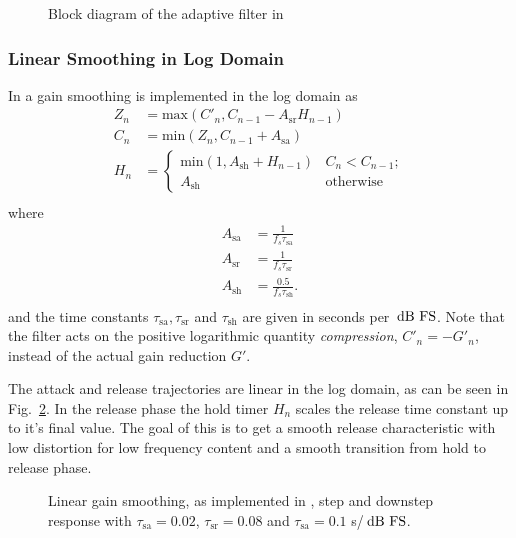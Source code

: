 \documentclass[../main2.tex]{subfiles}
\providecommand{\rootdir}{..}
\begin{document}
\begin{figure}
\centerline{}
\caption{Block diagram of the adaptive filter in \cite{mcnally1984dynamic}}
\label{fig:block_mcnally_theory_adap_filter}
\end{figure}
\subsubsection{Linear Smoothing in Log Domain}
In \cite{frindle1996implementation} a gain smoothing is implemented in the log domain as
\begin{equation}\label{eq:frindle_gainsmooth}
\begin{split}
Z_n &= \text{max}(C'_n, C_{n-1} - A_\text{sr} H_{n-1} )\\
C_n &= \text{min}(Z_n, C_{n-1} + A_\text{sa}) \\
H_n &=
\begin{cases}
    \text{min}(1,A_\text{sh} + H_{n-1})	& C_n < C_{n-1}; \\
    A_\text{sh}					& \text{otherwise}
\end{cases} \\
\end{split}
\end{equation}
where
\begin{equation}
\begin{split}
A_\text{sa} &= \frac{1}{f_s \tau_\text{sa}} \\
A_\text{sr} &= \frac{1}{f_s \tau_\text{sr}} \\
A_\text{sh} &= \frac{0.5}{f_s \tau_\text{sh}}. \\
\end{split}
\end{equation}
and the time constants $\tau_\text{sa}, \tau_\text{sr}$ and $\tau_\text{sh}$ are given in seconds per $\mskip3mu\text{dB~FS}$. Note that the filter acts on the positive logarithmic quantity \emph{compression}, $C'_n = -G'_n$, instead of the actual gain reduction $G'$.

The attack and release trajectories are linear in the log domain, as can be seen in Fig.~\ref{fig:step_frindle_gain}. In the release phase the hold timer $H_n$ scales the release time constant up to it's final value. The goal of this is to get a smooth release characteristic with low distortion for low frequency content and a smooth transition from hold to release phase.
\begin{figure}[h]
\centerline{}
\caption{Linear gain smoothing, as implemented in \cite{frindle1996implementation}, step and downstep response with $\tau_\text{sa}=0.02$, $\tau_\text{sr}=0.08$ and $\tau_\text{sa}= 0.1$ s/$\mskip3mu\text{dB~FS}$.}
\label{fig:step_frindle_gain}
\end{figure}
\end{document}
